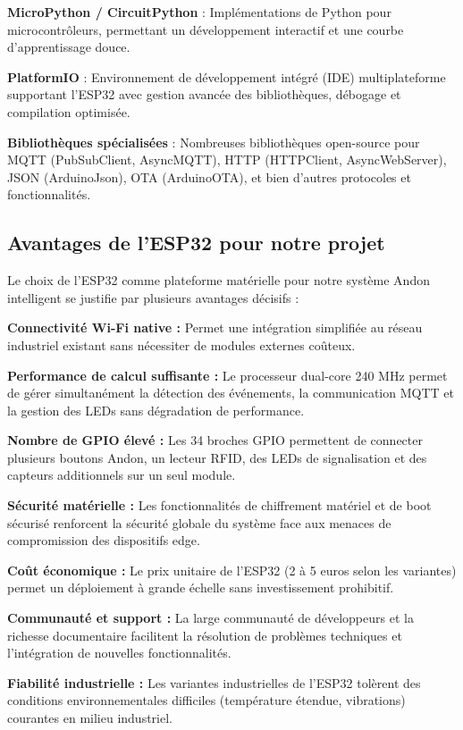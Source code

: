 \textbf{MicroPython / CircuitPython} : Implémentations de Python pour microcontrôleurs, permettant un développement interactif et une courbe d'apprentissage douce.

\textbf{PlatformIO} : Environnement de développement intégré (IDE) multiplateforme supportant l'ESP32 avec gestion avancée des bibliothèques, débogage et compilation optimisée.

\textbf{Bibliothèques spécialisées} : Nombreuses bibliothèques open-source pour MQTT (PubSubClient, AsyncMQTT), HTTP (HTTPClient, AsyncWebServer), JSON (ArduinoJson), OTA (ArduinoOTA), et bien d'autres protocoles et fonctionnalités.

\subsection{Avantages de l'ESP32 pour notre projet}

Le choix de l'ESP32 comme plateforme matérielle pour notre système Andon intelligent se justifie par plusieurs avantages décisifs :

\textbf{Connectivité Wi-Fi native :} Permet une intégration simplifiée au réseau industriel existant sans nécessiter de modules externes coûteux.

\textbf{Performance de calcul suffisante :} Le processeur dual-core 240 MHz permet de gérer simultanément la détection des événements, la communication MQTT et la gestion des LEDs sans dégradation de performance.

\textbf{Nombre de GPIO élevé :} Les 34 broches GPIO permettent de connecter plusieurs boutons Andon, un lecteur RFID, des LEDs de signalisation et des capteurs additionnels sur un seul module.


\textbf{Sécurité matérielle :} Les fonctionnalités de chiffrement matériel et de boot sécurisé renforcent la sécurité globale du système face aux menaces de compromission des dispositifs edge.

\textbf{Coût économique :} Le prix unitaire de l'ESP32 (2 à 5 euros selon les variantes) permet un déploiement à grande échelle sans investissement prohibitif.

\textbf{Communauté et support :} La large communauté de développeurs et la richesse documentaire facilitent la résolution de problèmes techniques et l'intégration de nouvelles fonctionnalités.

\textbf{Fiabilité industrielle :} Les variantes industrielles de l'ESP32 tolèrent des conditions environnementales difficiles (température étendue, vibrations) courantes en milieu industriel.

